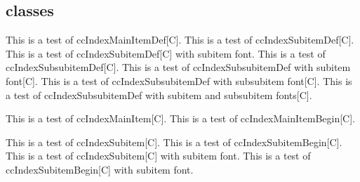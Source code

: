 \documentclass{article}
\begin{document}
{{{{\subsection{classes}
This is a test of ccIndexMainItemDef[C].
This is a test of ccIndexSubitemDef[C].
This is a test of ccIndexSubitemDef[C] with subitem font.
This is a test of ccIndexSubsubitemDef[C].
This is a test of ccIndexSubsubitemDef with subitem font[C].
This is a test of ccIndexSubsubitemDef with subsubitem font[C].
This is a test of ccIndexSubsubitemDef with subitem and subsubitem fonts[C].

\pagebreak

This is a test of ccIndexMainItem[C].
This is a test of ccIndexMainItemBegin[C].

This is a test of ccIndexSubitem[C].
This is a test of ccIndexSubitemBegin[C].
This is a test of ccIndexSubitem[C] with subitem font.
This is a test of ccIndexSubitemBegin[C] with subitem font.

}}}}
\end{document}

